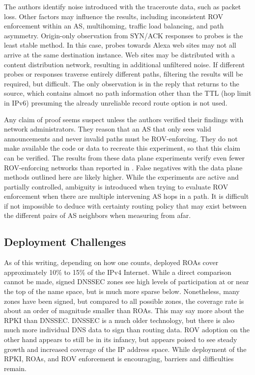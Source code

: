 \documentclass[sigconf]{acmart}
\begin{document}
The authors identify noise introduced with the traceroute data, such as
packet loss.  Other factors may influence the results, including
inconsistent ROV enforcement within an AS, multihoming, traffic load
balancing, and path asymmetry.  Origin-only observation from SYN/ACK
responses to probes is the least stable method.  In this case, probes
towards Alexa web sites may not all arrive at the same destination
instance.  Web sites may be distributed with a content distribution
network, resulting in additional unfiltered noise.  If different probes
or responses traverse entirely different paths, filtering the results
will be required, but difficult.   The only observation is in the reply
that returns to the source, which contains almost no path information
other than the TTL (hop limit in IPv6) presuming the already unreliable
record route option is not used.

Any claim of proof seems suspect unless the authors verified their
findings with network administrators.  They reason that an AS that only
sees valid announcements and never invalid paths must be ROV-enforcing.
They do not make available the code or data to recreate this experiment,
so that this claim can be verified.  The results from these data plane
experiments verify even fewer ROV-enforcing networks than reported in
\cite{reuter_towards_2018}.  False negatives with the data plane methods
outlined here are likely higher.  While the experiments are active and
partially controlled, ambiguity is introduced when trying to evaluate
ROV enforcement when there are multiple intervening AS hops in a path.
It is difficult if not impossible to deduce with certainty routing
policy that may exist between the different pairs of AS neighbors when
measuring from afar.

\subsection{Deployment Challenges}

As of this writing, depending on how one counts, deployed ROAs cover
approximately 10\% to 15\% of the IPv4 Internet.  While a direct
comparison cannot be made, signed DNSSEC zones see high levels of
participation at or near the top of the name space, but is much more
sparse below.  Nonetheless, many zones have been signed, but compared to
all possible zones, the coverage rate is about an order of magnitude
smaller than ROAs.  This may say more about the RPKI than DNSSEC.
DNSSEC is a much older technology, but there is also much more
individual DNS data to sign than routing data.  ROV adoption on the
other hand appears to still be in its infancy, but appears poised to see
steady growth and increased coverage of the IP address space.  While
deployment of the RPKI, ROAs, and ROV enforcement is encouraging,
barriers and difficulties remain.
\end{document}
